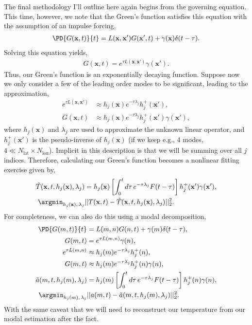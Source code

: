 The final methodology I'll outline here again begins from the governing equation. This time, however, we note that the Green's function satisfies this equation with the assumption of an impulse forcing,
\begin{align}
  \PD{G(\mathbf{x},t)}{t} = L(\mathbf{x},\mathbf{x}') G(\mathbf{x}',t) + \gamma(\mathbf{x}) \delta(t - \tau).
\end{align}
Solving this equation yields,
\begin{align}
  G(\mathbf{x},t) = e^{\tau L(\mathbf{x},\mathbf{x}')} \gamma(\mathbf{x}').
\end{align}
Thus, our Green's function is an exponentially decaying function. Suppose now we only consider a few of the leading order modes to be significant, leading to the approximation,
\begin{align}
  e^{\tau L(\mathbf{x},\mathbf{x}')} &\approx h_j(\mathbf{x}) e^{-\tau \lambda_j} h_j^+(\mathbf{x}'),\\
  G(\mathbf{x},t) &\approx h_j(\mathbf{x}) e^{-\tau \lambda_j} h_j^+(\mathbf{x}')\gamma(\mathbf{x}'),
\end{align}
where $h_j(\mathbf{x})$ and $\lambda_j$ are used to approximate the unknown linear operator, and $h_j^+(\mathbf{x}')$ is the pseudo-inverse of $h_j(\mathbf{x})$ (if we keep e.g., 4 modes, $4 \ll N_{\text{lat}} \times N_{\text{lon}}$). Implicit in this description is that we will be summing over all $j$ indices. Therefore, calculating our Green's function becomes a nonlinear fitting exercise given by,
\begin{align}
  \tilde{T}(\mathbf{x},t,h_j(\mathbf{x}),\lambda_j) &= h_j(\mathbf{x}) \left[ \int_0^t d\tau \, e^{-\tau \lambda_j} F(t - \tau) \right] h_j^+(\mathbf{x}') \gamma(\mathbf{x}'),\\
  \argmin_{h_j(\mathbf{x}), \, \lambda_j} &||T(\mathbf{x},t) - \tilde{T}(\mathbf{x},t,h_j(\mathbf{x}),\lambda_j)||^2_2.
\end{align}
For completeness, we can also do this using a modal decomposition,
\begin{align}
  \PD{G(m,t)}{t} &= L(m,n) G(n,t) + \gamma(m) \delta(t - \tau),\\
  G(m,t) &= e^{\tau L(m,n)} \gamma(n),\\
  e^{\tau L(m,n)} &\approx h_j(m) e^{-\tau \lambda_j} h_j^+(n),\\
  G(m,t) &\approx h_j(m) e^{-\tau \lambda_j} h_j^+(n)\gamma(n),\\
  \tilde{a}(m,t,h_j(m),\lambda_j) &= h_j(m) \left[ \int_0^t d\tau \, e^{-\tau \lambda_j} F(t - \tau) \right] h_j^+(n) \gamma(n),\\
  \argmin_{h_j(m), \, \lambda_j} &||a(m,t) - \tilde{a}(m,t,h_j(m),\lambda_j)||^2_2.
\end{align}
With the same caveat that we will need to reconstruct our temperature from our modal estimation after the fact.

